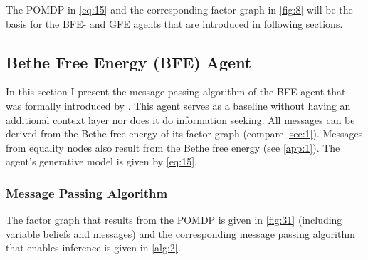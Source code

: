 The POMDP in \cref{eq:15} and the corresponding factor graph in \cref{fig:8} will be the basis for the BFE- and GFE agents that are introduced in following sections.


\subsection{Bethe Free Energy (BFE) Agent}

In this section I present the message passing algorithm of the BFE agent that was formally introduced by \textcite{schwoebel2018}. This agent serves as a baseline without having an additional context layer nor does it do information seeking. All messages can be derived from the Bethe free energy of its factor graph (compare \cref{sec:1}). Messages from equality nodes also result from the Bethe free energy (see \cref{app:1}). The agent's generative model is given by \cref{eq:15}.

\subsubsection{Message Passing Algorithm}

The factor graph that results from the POMDP is given in \cref{fig:31} (including variable beliefs and messages) and the corresponding message passing algorithm that enables inference is given in \cref{alg:2}.

